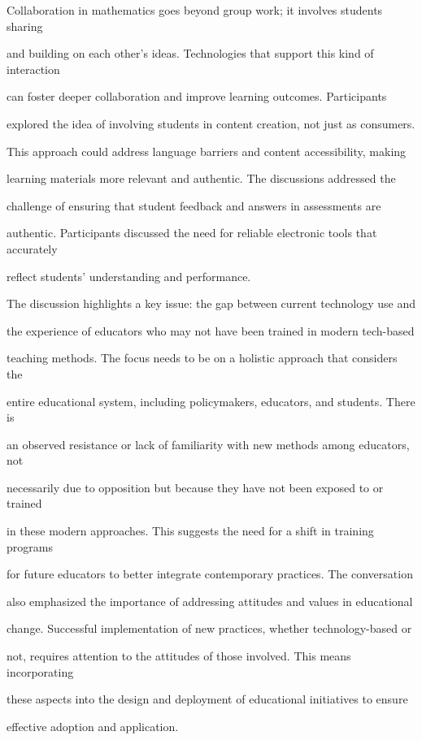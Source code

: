 \documentclass[11pt]{article}
\begin{document}
Collaboration in mathematics goes beyond group work; it involves students sharing

and building on each other's ideas. Technologies that support this kind of interaction

can foster deeper collaboration and improve learning outcomes. Participants

explored the idea of involving students in content creation, not just as consumers.

This approach could address language barriers and content accessibility, making

learning materials more relevant and authentic. The discussions addressed the

challenge of ensuring that student feedback and answers in assessments are

authentic. Participants discussed the need for reliable electronic tools that accurately

reflect students' understanding and performance.

The discussion highlights a key issue: the gap between current technology use and

the experience of educators who may not have been trained in modern tech-based

teaching methods. The focus needs to be on a holistic approach that considers the

entire educational system, including policymakers, educators, and students. There is

an observed resistance or lack of familiarity with new methods among educators, not

necessarily due to opposition but because they have not been exposed to or trained

in these modern approaches. This suggests the need for a shift in training programs

for future educators to better integrate contemporary practices. The conversation

also emphasized the importance of addressing attitudes and values in educational

change. Successful implementation of new practices, whether technology-based or

not, requires attention to the attitudes of those involved. This means incorporating

these aspects into the design and deployment of educational initiatives to ensure

effective adoption and application.
\end{document}
